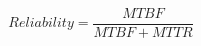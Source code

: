 \documentclass[12pt]{article}
\begin{document}
\begin{displaymath}
Reliability = \frac{MTBF}{MTBF + MTTR}
\end{displaymath}
\end{document}
